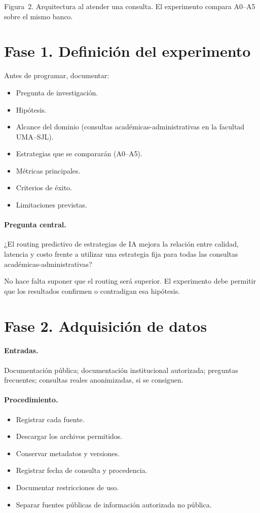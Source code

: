 \documentclass[11pt,a4paper]{article}
\begin{document}
{\footnotesize Figura~2. Arquitectura al atender una consulta. El experimento compara A0--A5 sobre el mismo banco.}

\section{Fase 1. Definición del experimento}

Antes de programar, documentar:

\begin{itemize}
  \item Pregunta de investigación.
  \item Hipótesis.
  \item Alcance del dominio (consultas académicas-administrativas en la facultad UMA--SJL).
  \item Estrategias que se compararán (A0--A5).
  \item Métricas principales.
  \item Criterios de éxito.
  \item Limitaciones previstas.
\end{itemize}

\paragraph{Pregunta central.}
¿El routing predictivo de estrategias de IA mejora la relación entre calidad, latencia y costo frente a utilizar una estrategia fija para todas las consultas académicas-administrativas?

No hace falta suponer que el routing será superior. El experimento debe permitir que los resultados confirmen o contradigan esa hipótesis.

\section{Fase 2. Adquisición de datos}

\paragraph{Entradas.}
Documentación pública; documentación institucional autorizada; preguntas frecuentes; consultas reales anonimizadas, si se consiguen.

\paragraph{Procedimiento.}
\begin{itemize}
  \item Registrar cada fuente.
  \item Descargar los archivos permitidos.
  \item Conservar metadatos y versiones.
  \item Registrar fecha de consulta y procedencia.
  \item Documentar restricciones de uso.
  \item Separar fuentes públicas de información autorizada no pública.
\end{itemize}
\end{document}
